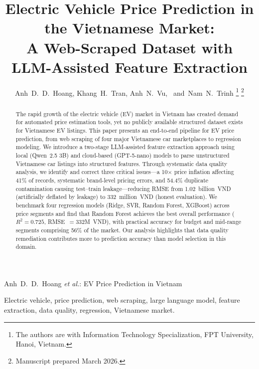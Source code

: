 \documentclass[lettersize,journal]{IEEEtran}
\begin{document}
\title{Electric Vehicle Price Prediction in the Vietnamese Market:\\ A Web-Scraped Dataset with LLM-Assisted Feature Extraction}

\author{Anh~D.~D.~Hoang, Khang~H.~Tran, Anh~N.~Vu, ~and~Nam~N.~Trinh
\thanks{The authors are with Information Technology Specialization, FPT University, Hanoi, Vietnam.}
\thanks{Manuscript prepared March 2026.}}

%
{Anh~D.~D.~Hoang \MakeLowercase{\textit{et al.}}: EV Price Prediction in Vietnam}

\maketitle

\begin{abstract}
The rapid growth of the electric vehicle (EV) market in Vietnam has created
demand for automated price estimation tools, yet no publicly available
structured dataset exists for Vietnamese EV listings. This paper presents an
end-to-end pipeline for EV price prediction, from web scraping of four major
Vietnamese car marketplaces to regression modeling. We introduce a two-stage
LLM-assisted feature extraction approach using local (Qwen~2.5 3B) and
cloud-based (GPT-5-nano) models to parse unstructured Vietnamese car listings
into structured features. Through systematic data quality analysis, we
identify and correct three critical issues---a 10$\times$ price inflation
affecting 41\% of records, systematic brand-level pricing errors, and 54.4\%
duplicate contamination causing test--train leakage---reducing RMSE from
1.02~billion~VND (artificially deflated by leakage) to 332~million~VND
(honest evaluation). We benchmark four regression models (Ridge, SVR, Random
Forest, XGBoost) across price segments and find that Random Forest achieves
the best overall performance ($R^2 = 0.725$, RMSE~$= 332$M~VND), with
practical accuracy for budget and mid-range segments comprising 56\% of the
market. Our analysis highlights that data quality remediation contributes
more to prediction accuracy than model selection in this domain.
\end{abstract}

\begin{IEEEkeywords}
Electric vehicle, price prediction, web scraping, large language model,
feature extraction, data quality, regression, Vietnamese market.
\end{IEEEkeywords}
\end{document}

